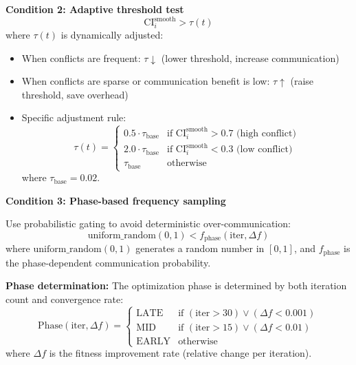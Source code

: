 \documentclass[11pt,a4paper]{article}
\begin{document}
\textbf{Condition 2: Adaptive threshold test}
\begin{equation}
\text{CI}_i^{\text{smooth}} > \tau(t)
\end{equation}
where $\tau(t)$ is dynamically adjusted:
\begin{itemize}
    \item When conflicts are frequent: $\tau \downarrow$ (lower threshold, increase communication)
    \item When conflicts are sparse or communication benefit is low: $\tau \uparrow$ (raise threshold, save overhead)
    \item Specific adjustment rule:
    \begin{equation}
    \tau(t) = \begin{cases}
    0.5 \cdot \tau_{\text{base}} & \text{if } \text{CI}_i^{\text{smooth}} > 0.7 \text{ (high conflict)} \\
    2.0 \cdot \tau_{\text{base}} & \text{if } \text{CI}_i^{\text{smooth}} < 0.3 \text{ (low conflict)} \\
    \tau_{\text{base}} & \text{otherwise}
    \end{cases}
    \end{equation}
    where $\tau_{\text{base}} = 0.02$.
\end{itemize}

\textbf{Condition 3: Phase-based frequency sampling}

Use probabilistic gating to avoid deterministic over-communication:
\begin{equation}
\text{uniform\_random}(0,1) < f_{\text{phase}}(\text{iter}, \Delta f)
\end{equation}
where $\text{uniform\_random}(0,1)$ generates a random number in $[0,1]$, and $f_{\text{phase}}$ is the phase-dependent communication probability.

\textbf{Phase determination:} The optimization phase is determined by both iteration count and convergence rate:
\begin{equation}
\text{Phase}(\text{iter}, \Delta f) = \begin{cases}
\text{LATE} & \text{if } (\text{iter} > 30) \lor (\Delta f < 0.001) \\
\text{MID} & \text{if } (\text{iter} > 15) \lor (\Delta f < 0.01) \\
\text{EARLY} & \text{otherwise}
\end{cases}
\end{equation}
where $\Delta f$ is the fitness improvement rate (relative change per iteration).
\end{document}
